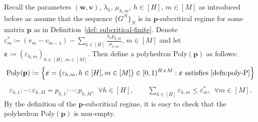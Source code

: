 \documentclass[11pt, reqno]{article}
\numberwithin{equation}{section}
\numberwithin{theorem}{section}
\begin{document}
Recall the parameters $(\mathbf{w},\mathbf{v})$, $\lambda_h$, $\mu_{h,m}$, $h\in[H]$, $m\in[M]$ as introduced before as assume that the sequence $\{G^N\}_{N}$ is in $\mathbf{p}$-subcritical regime for 
some matrix $\mathbf{p}$ as in Definition~\ref{def: subcritical-finite}. 
Denote $\varepsilon^*_m\coloneqq (v_m-v_{m-1})-\sum_{h\in[H]}\frac{\lambda_hp_{h,m}}{\mu_{h,m}}$, $m\in[M]$ and let $\boldsymbol\varepsilon\coloneqq(\varepsilon_{h,m})_{h\in[H],m\in[M]}$.
Then define a polyhedron $\mathrm{Poly}(\mathbf{p})$ as follows:
\begin{equation}\label{eq:poly}
    \mathrm{Poly}(\mathbf{p})\coloneqq\Big\{\boldsymbol\varepsilon=\big(\varepsilon_{h,m},h\in[H],m\in[M]\big)\in[0,1)^{H\times M}:\boldsymbol\varepsilon \text{ satisfies } \eqref{defn:poly-P}\Big\}
\end{equation}
\begin{equation}\label{defn:poly-P}
    \begin{split}    \varepsilon_{h,1}:\cdots:\varepsilon_{h,M}  =  p_{h,1}:\cdots:p_{h,M},\ \ \forall h\in[H],\qquad
        \sum_{h\in[H]}\varepsilon_{h,m}  \leq  \varepsilon^*_m,\ \  \forall m\in[M].
    \end{split}
\end{equation}
By the definition of the $\mathbf{p}$-subcritical regime, it is easy to check that the polyhedron $\mathrm{Poly}(\mathbf{p})$ is non-empty. \\
\end{document}
